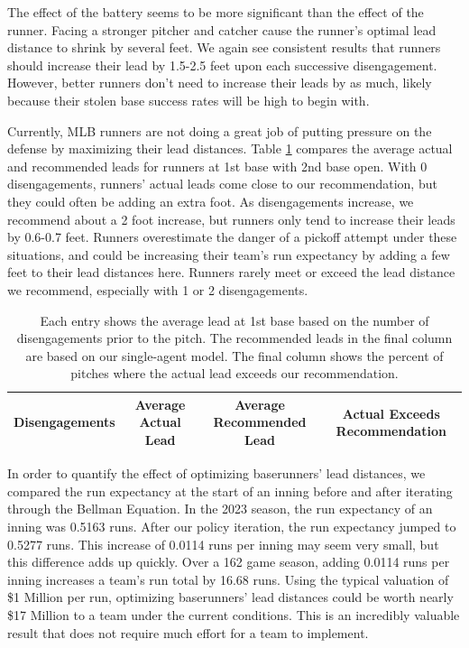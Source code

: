 \documentclass{article}
\begin{document}
        The effect of the battery seems to be more significant than the effect of the runner. Facing a stronger pitcher and catcher cause the runner's optimal lead distance to shrink by several feet. We again see consistent results that runners should increase their lead by 1.5-2.5 feet upon each successive disengagement. However, better runners don't need to increase their leads by as much, likely because their stolen base success rates will be high to begin with.

        Currently, MLB runners are not doing a great job of putting pressure on the defense by maximizing their lead distances. Table \ref{tab:actual-vs-rec} compares the average actual and recommended leads for runners at 1st base with 2nd base open. With 0 disengagements, runners' actual leads come close to our recommendation, but they could often be adding an extra foot. As disengagements increase, we recommend about a 2 foot increase, but runners only tend to increase their leads by 0.6-0.7 feet. Runners overestimate the danger of a pickoff attempt under these situations, and could be increasing their team's run expectancy by adding a few feet to their lead distances here. Runners rarely meet or exceed the lead distance we recommend, especially with 1 or 2 disengagements.

        \begin{table}
          \centering
          \begin{tabular}{c|ccc}
            Disengagements & Average Actual Lead & Average Recommended Lead & Actual Exceeds Recommendation\\
            \hline
            
          \end{tabular}
          \caption{Each entry shows the average lead at 1st base based on the number of disengagements prior to the pitch. The recommended leads in the final column are based on our single-agent model. The final column shows the percent of pitches where the actual lead exceeds our recommendation.}
          \label{tab:actual-vs-rec}
        \end{table}


        In order to quantify the effect of optimizing baserunners' lead distances, we compared the run expectancy at the start of an inning before and after iterating through the Bellman Equation. In the 2023 season, the run expectancy of an inning was 0.5163 runs. After our policy iteration, the run expectancy jumped to 0.5277 runs. This increase of 0.0114 runs per inning may seem very small, but this difference adds up quickly. Over a 162 game season, adding 0.0114 runs per inning increases a team's run total by 16.68 runs. Using the typical valuation of \$1 Million per run, optimizing baserunners' lead distances could be worth nearly \$17 Million to a team under the current conditions. This is an incredibly valuable result that does not require much effort for a team to implement.
\end{document}
